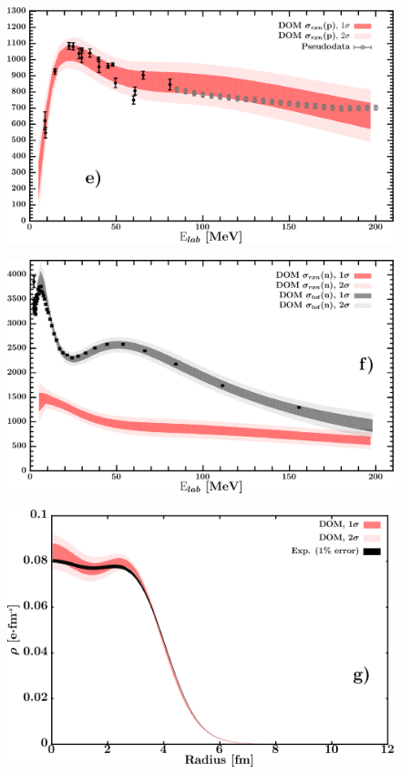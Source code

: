 \documentclass[twocolumn,secnumarabic,amssymb, nobibnotes, aps, prl,
superscriptaddress, nobalancelastpage, draft]{revtex4}
\begin{document}
\begin{figure}[!htb]
\begin{minipage}{0.4\linewidth}
        \label{DOM_ni58_neutron_elastic}
    \end{minipage}
    \centering
    \begin{minipage}{0.4\linewidth}
        \centering
        \includegraphics[width=\linewidth]{figures/ni58_protonInelastic.png}
        \label{DOM_ni58_proton_inelastic}
    \end{minipage}\hspace{6pt}
    \begin{minipage}{0.4\linewidth}
        \centering
        \includegraphics[width=\linewidth]{figures/ni58_neutronInelastic.png}
        \label{DOM_ni58_neutron_inelastic}
    \end{minipage}
    \centering
    \begin{minipage}{0.4\linewidth}
        \centering
        \includegraphics[width=\linewidth]{figures/ni58_chargeDensity.png}

\end{minipage}
\end{figure}
\end{document}
